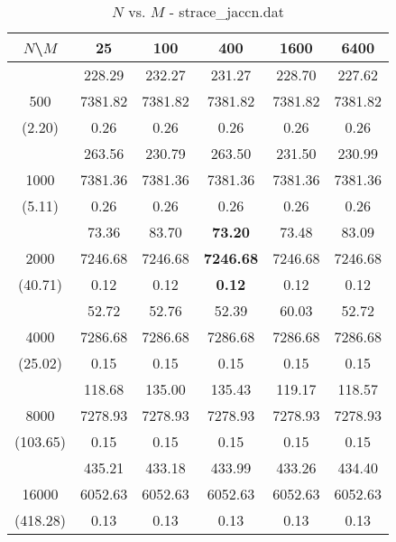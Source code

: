 \documentclass[conference]{IEEEtran}
\begin{document}
\begin{table}[th]
\caption{$N$ vs. $M$ - strace\_jaccn.dat}
\label{tab:strace_jaccn.dat}
\centering
\begin{tabular}{|c||c|c|c|c|c|}
\hline
$N$\textbackslash $M$ & 25 & 100 & 400 & 1600 & 6400 \\ \hline \hline
  & 228.29 & 232.27 & 231.27 & 228.70 & 227.62\\ 
500  & 7381.82 & 7381.82 & 7381.82 & 7381.82 & 7381.82\\ 
(2.20)  & 0.26 & 0.26 & 0.26 & 0.26 & 0.26\\ \hline 
  & 263.56 & 230.79 & 263.50 & 231.50 & 230.99\\ 
1000  & 7381.36 & 7381.36 & 7381.36 & 7381.36 & 7381.36\\ 
(5.11)  & 0.26 & 0.26 & 0.26 & 0.26 & 0.26\\ \hline 
  & 73.36 & 83.70 & {\bf 73.20} & 73.48 & 83.09\\ 
2000  & 7246.68 & 7246.68 & {\bf 7246.68} & 7246.68 & 7246.68\\ 
(40.71)  & 0.12 & 0.12 & {\bf 0.12} & 0.12 & 0.12\\ \hline 
  & 52.72 & 52.76 & 52.39 & 60.03 & 52.72\\ 
4000  & 7286.68 & 7286.68 & 7286.68 & 7286.68 & 7286.68\\ 
(25.02)  & 0.15 & 0.15 & 0.15 & 0.15 & 0.15\\ \hline 
  & 118.68 & 135.00 & 135.43 & 119.17 & 118.57\\ 
8000  & 7278.93 & 7278.93 & 7278.93 & 7278.93 & 7278.93\\ 
(103.65)  & 0.15 & 0.15 & 0.15 & 0.15 & 0.15\\ \hline 
  & 435.21 & 433.18 & 433.99 & 433.26 & 434.40\\ 
16000  & 6052.63 & 6052.63 & 6052.63 & 6052.63 & 6052.63\\ 
(418.28)  & 0.13 & 0.13 & 0.13 & 0.13 & 0.13\\ \hline 
\end{tabular}
\end{table}
\end{document}
